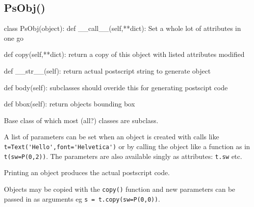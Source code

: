 \documentclass[a4paper]{book}
\begin{document}
\subsection{PsObj()}
\label{sec:psobj}
\begin{python}
class PsObj(object):
    def __call__(self,**dict):
        Set a whole lot of attributes in one go

    def copy(self,**dict):
        return a copy of this object
        with listed attributes modified

    def __str__(self):
        return actual postscript string to generate object

    def body(self):
        subclasses should overide this for generating postscipt code

    def bbox(self):
        return objects bounding box
\end{python}

Base class of which most (all?) \pyscript classes are subclass.

A list of parameters can be set when an object is created with
calls like \Verb|t=Text('Hello',font='Helvetica')|
or by calling the object like a function as in \Verb|t(sw=P(0,2))|.
The parameters are also available singly as attributes: \Verb|t.sw| etc.

Printing an object produces the actual postscript code.

Objects may be copied with the \Verb|copy()| function and new
parameters can be passed in as arguments eg \Verb|s = t.copy(sw=P(0,0))|.

\end{document}
